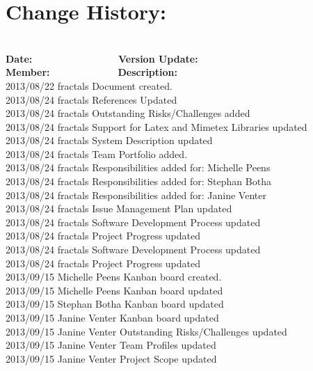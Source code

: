 \documentclass[29pt,a4paper]{moderncv}
\begin{document}
\section{\textbf{Change History:}}
\begin{tabbing}
\\\textbf{Date:} ~~~~~~~~~~~~~~~~~\= \textbf{Version Update:}~~~~~~~ \= \textbf{Member:}~~~~~~~~~~~~~~\= \textbf{Description:}\\
2013/08/22 \> fractals \> Document created.\\
2013/08/24  \> fractals \> References Updated\\
2013/08/24  \> fractals \> Outstanding Risks/Challenges added\\
2013/08/24  \> fractals \> Support for Latex and Mimetex Libraries updated\\
2013/08/24  \> fractals \> System Description updated\\
2013/08/24  \> fractals \> Team Portfolio added. \\
2013/08/24  \> fractals \> Responsibilities added for: Michelle Peens\\
2013/08/24  \> fractals \> Responsibilities added for: Stephan Botha\\	
2013/08/24  \> fractals \> Responsibilities added for: Janine Venter\\
2013/08/24  \> fractals \> Issue Management Plan updated\\
2013/08/24  \> fractals \> Software Development Process updated\\
2013/08/24  \> fractals \> Project Progress updated\\
2013/08/24  \> fractals \> Software Development Process updated\\
2013/08/24  \> fractals \> Project Progress updated\\
2013/09/15  \> Michelle Peens \> Kanban board created.\\
2013/09/15  \>  Michelle Peens \> Kanban board updated\\
2013/09/15  \> Stephan Botha \> Kanban board updated\\
2013/09/15  \> Janine Venter \> Kanban board updated\\
2013/09/15  \> Janine Venter \> Outstanding Risks/Challenges updated\\
2013/09/15  \> Janine Venter \> Team Profiles updated\\
2013/09/15  \>  Janine Venter \> Project Scope updated\\

\end{tabbing}
\end{document}
